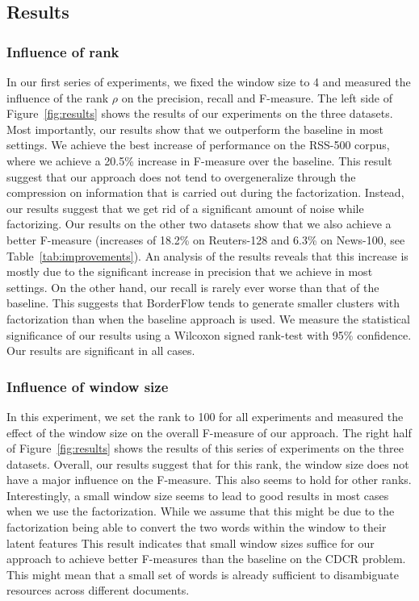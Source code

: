 \documentclass{llncs}
\begin{document}
\subsection{Results}

\subsubsection{Influence of rank}
In our first series of experiments, we fixed the window size to 4 and measured the influence of the rank $\rho$ on the precision, recall and F-measure. 
The left side of Figure~\ref{fig:results} shows the results of our experiments on the three datasets.
Most importantly, our results show that we outperform the baseline in most settings.
We achieve the best increase of performance on the RSS-500 corpus, where we achieve a 20.5\% increase in F-measure over the baseline.
This result suggest that our approach does not tend to overgeneralize through the compression on information that is carried out during the factorization.
Instead, our results suggest that we get rid of a significant amount of noise while factorizing.
Our results on the other two datasets show that we also achieve a better F-measure (increases of 18.2\% on Reuters-128 and 6.3\% on News-100, see Table~\ref{tab:improvements}). 
An analysis of the results reveals that this increase is mostly due to the significant increase in precision that we achieve in most settings.
On the other hand, our recall is rarely ever worse than that of the baseline.
This suggests that BorderFlow tends to generate smaller clusters with factorization than when the baseline approach is used.
We measure the statistical significance of our results using a Wilcoxon signed rank-test with 95\% confidence.
Our results are significant in all cases.%

\subsubsection{Influence of window size}
In this experiment, we set the rank to 100 for all experiments and measured the effect of the window size on the overall F-measure of our approach.
The right half of Figure~\ref{fig:results} shows the results of this series of experiments on the three datasets.
Overall, our results suggest that for this rank, the window size does not have a major influence on the F-measure. 
This also seems to hold for other ranks.
Interestingly, a small window size seems to lead to good results in most cases when we use the factorization. While we assume that this might be due to the factorization being able to convert the two words within the window to their latent features    
This result indicates that small window sizes suffice for our approach to achieve better F-measures than the baseline on the CDCR problem.
This might mean that a small set of words is already sufficient to disambiguate resources across different documents.
\end{document}
